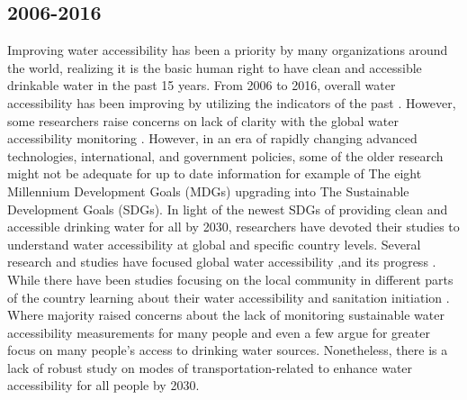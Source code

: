 \documentclass[10pt,twoside]{article}
\numberwithin{equation}{section}
\newcommand{\?}{\stackrel{?}{=}}
\begin{document}
\subsection{2006-2016}
Improving water accessibility has been a priority by many organizations around the world, realizing it is the basic human right to have clean and accessible drinkable water in the past 15 years. From 2006 to 2016, overall water accessibility has been improving by utilizing the indicators of the past \citep{fullerTrackingProgressGlobal2016}. However, some researchers raise concerns on lack of clarity with the global water accessibility monitoring \citep{ondaGlobalAccessSafe2012, jiaHighResolutionSpatialDistribution2016}. However, in an era of rapidly changing advanced technologies, international, and government policies, some of the older research might not be adequate for up to date information for example of The eight Millennium Development Goals (MDGs) upgrading into The Sustainable Development Goals (SDGs). In light of the newest SDGs of providing clean and accessible drinking water for all by 2030, researchers have devoted their studies to understand water accessibility at global and specific country levels. Several research and studies have focused global water accessibility ,and its progress \citep{sorensonSafeAccessSafe2011,bainAccountingWaterQuality2012,wssccWaterSanitationHygiene2014,  ondaGlobalAccessSafe2012, bartramGlobalMonitoringWater2014, ondaCountryClusteringApplied2014, whoDrinkingwater,fullerTrackingProgressGlobal2016, weiyuyuGlobalPerspectiveDrinkingwater2016, grahamAnalysisWaterCollection2016,overboOnplotDrinkingWater2016}. While there have been studies focusing on the local community in different parts of the country learning about their water accessibility and sanitation initiation \citep{jagalsDoesImprovedAccess2006, geereDomesticWaterCarrying2010, simaWaterFlowsEnergy2013, hoChallengeGlobalWater2014, sakisakaIntroductionCommunityWater2015, jiaHighResolutionSpatialDistribution2016}. Where majority raised concerns about the lack of monitoring sustainable water accessibility measurements for many people and even a few argue for greater focus on many people's access to drinking water sources. Nonetheless, there is a lack of robust study on modes of transportation-related to enhance water accessibility for all people by 2030. 
\end{document}

